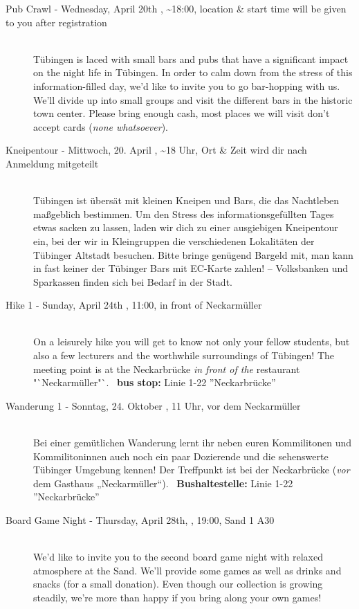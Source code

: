 \begin{description}
\ifml
	\item[Pub Crawl - Wednesday, April 20th \YEAR, \textasciitilde 18:00, \footnotesize{location \& start time will be given to you after registration}]~\\
Tübingen is laced with small bars and pubs that have a significant impact on the night life in Tübingen.
In order to calm down from the stress of this information-filled day, we'd like to invite you to go bar-hopping with us.
We'll divide up into small groups and visit the different bars in the historic town center.
Please bring enough cash, most places we will visit don't accept cards (\emph{none whatsoever}).

\else
	\item[Kneipentour - Mittwoch, 20. April \YEAR, \textasciitilde 18 Uhr, \footnotesize{Ort \& Zeit wird dir nach Anmeldung mitgeteilt}]~\\
Tübingen ist übersät mit kleinen Kneipen und Bars, die das Nachtleben maßgeblich bestimmen.
Um den Stress des informationsgefüllten Tages etwas sacken zu lassen, laden wir dich zu einer ausgiebigen Kneipentour ein,
bei der wir in Kleingruppen die verschiedenen Lokalitäten der Tübinger Altstadt besuchen.
Bitte bringe genügend Bargeld mit, man kann in fast keiner der Tübinger Bars mit EC-Karte zahlen! -- Volksbanken und Sparkassen
finden sich bei Bedarf in der Stadt.
\fi

\ifml
    \item[Hike 1 - Sunday, April 24th \YEAR, 11:00, in front of Neckarmüller]~\\
        On a leisurely hike you will get to know not only your fellow students,
        but also a few lecturers and the worthwhile surroundings of Tübingen!
        The meeting point is at the Neckarbrücke \emph{in front of the} restaurant "`Neckarmüller"`.
        ~\textbf{bus stop:} Linie 1-22 ''Neckarbrücke''
\else
    \item[Wanderung 1 - Sonntag, 24. Oktober \YEAR, 11 Uhr, vor dem Neckarmüller]~\\
        Bei einer gemütlichen Wanderung lernt ihr neben euren Kommilitonen und Kommilitoninnen auch
        noch ein paar Dozierende und die sehenswerte Tübinger Umgebung kennen!
        Der Treffpunkt ist bei der Neckarbrücke (\emph{vor} dem Gasthaus „Neckarmüller“).
	    ~\textbf{Bushaltestelle:} Linie 1-22 ''Neckarbrücke''
\fi

\ifml
\item[Board Game Night - Thursday, April 28th, \YEAR, 19:00, Sand 1 A30]\ \\
We'd like to invite you to the second board game night with relaxed atmosphere at the Sand.
We'll provide some games as well as drinks and snacks (for a small donation).
Even though our collection is growing steadily, we're more than happy if you bring along your own games!


\end{description}
